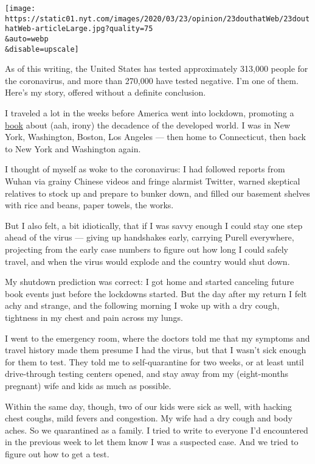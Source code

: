 \texttt{[image: https://static01.nyt.com/images/2020/03/23/opinion/23douthatWeb/23douthatWeb-articleLarge.jpg?quality=75\\\&auto=webp\\\&disable=upscale]}

As of this writing, the United States has tested approximately 313,000
people for the coronavirus, and more than 270,000 have tested negative.
I'm one of them. Here's my story, offered without a definite conclusion.

I traveled a lot in the weeks before America went into lockdown,
promoting a
\href{https://www.simonandschuster.com/books/The-Decadent-Society/Ross-Douthat/9781476785240}{book}
about (aah, irony) the decadence of the developed world. I was in New
York, Washington, Boston, Los Angeles --- then home to Connecticut, then
back to New York and Washington again.

I thought of myself as woke to the coronavirus: I had followed reports
from Wuhan via grainy Chinese videos and fringe alarmist Twitter, warned
skeptical relatives to stock up and prepare to bunker down, and filled
our basement shelves with rice and beans, paper towels, the works.

But I also felt, a bit idiotically, that if I was savvy enough I could
stay one step ahead of the virus --- giving up handshakes early,
carrying Purell everywhere, projecting from the early case numbers to
figure out how long I could safely travel, and when the virus would
explode and the country would shut down.

My shutdown prediction was correct: I got home and started canceling
future book events just before the lockdowns started. But the day after
my return I felt achy and strange, and the following morning I woke up
with a dry cough, tightness in my chest and pain across my lungs.

I went to the emergency room, where the doctors told me that my symptoms
and travel history made them presume I had the virus, but that I wasn't
sick enough for them to test. They told me to self-quarantine for two
weeks, or at least until drive-through testing centers opened, and stay
away from my (eight-months pregnant) wife and kids as much as possible.

Within the same day, though, two of our kids were sick as well, with
hacking chest coughs, mild fevers and congestion. My wife had a dry
cough and body aches. So we quarantined as a family. I tried to write to
everyone I'd encountered in the previous week to let them know I was a
suspected case. And we tried to figure out how to get a test.

